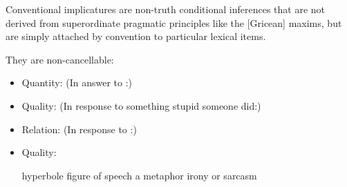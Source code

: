 \documentclass[headrule,footrule]{foils}
\begin{document}
\MyLogo{}

Conventional implicatures are non-truth conditional inferences that
are not derived from superordinate pragmatic principles like the
[Gricean] maxims, but are simply attached by convention to particular
lexical items.

They are non-cancellable:
\begin{exe}
  \ex
  \begin{xlist}
    \ex {}
    \ex {}
  \end{xlist}
\end{exe}

\begin{itemize}
\item Quantity:	(In answer to :) 
\item Quality:	(In response to something stupid someone did:) 
\item Relation:	(In response to :) 
\item Quality:
  \begin{exe}
    \ex {} \hfill hyperbole
    \ex {} \hfill figure of speech
    \ex {} \hfill a metaphor
    \ex {} \hfill irony or sarcasm
  \end{exe}
\end{itemize}
\end{document}
